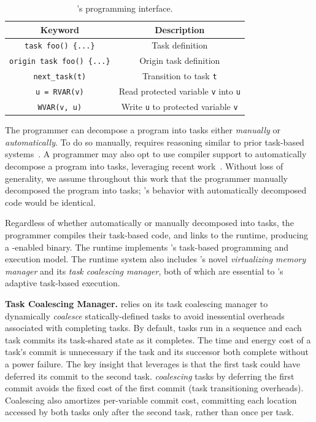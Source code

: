 \begin{table}
	\centering
	\footnotesize
	\begin{tabular}{|c|c|}
		\hline
		\textbf{Keyword} & \textbf{Description} \\
		\hline\hline
		\texttt{task foo() \{...\}} & Task definition\\
		\texttt{origin task foo() \{...\}} & Origin task definition\\
		\texttt{next\_task(t)} & Transition to task \texttt{t}\\
		\texttt{u = RVAR(v)} & Read protected variable \texttt{v} into \texttt{u}\\
		\texttt{WVAR(v, u)} & Write \texttt{u} to protected variable \texttt{v}\\
		\hline
	\end{tabular}
	\caption{\sys's programming interface.}
	\label{tab:viper_syntax}
\end{table}

The programmer can decompose a program into tasks either {\em manually} or {\em
automatically}. To do so manually,  requires reasoning similar to prior
task-based systems~\cite{chain,alpaca}.  
%
A programmer may also opt to use compiler support to automatically decompose a
program into tasks, leveraging recent work~\cite{cleancut,baghsorkhi_cgo_2018}.
%
Without loss of generality, we assume throughout this work that the programmer
manually decomposed the program into tasks; \sys's behavior with automatically
decomposed code would be identical.
%

Regardless of whether automatically or manually decomposed into tasks, the
programmer compiles their task-based code, and links to the \sys runtime,
producing a \sys-enabled binary.
%
The \sys runtime implements \sys's task-based programming and execution model.
%
The runtime system also includes \sys's novel {\em virtualizing memory manager}
and its {\em task coalescing manager}, both of which are essential to \sys's
adaptive task-based execution.

\textbf{\sys Task Coalescing Manager.} \sys relies on its task coalescing
manager to dynamically {\em coalesce} statically\hyp{}defined tasks to avoid
inessential overheads associated with completing tasks.  
%
By default, tasks run in a sequence and each task commits its task-shared state
as it completes.  The time and energy cost of a task's commit is unnecessary if
the task and its successor both complete without a power failure.  The key
insight that \sys leverages is that the first task could have deferred its
commit to the second task. {\em coalescing} tasks by deferring the first commit
avoids the fixed cost of the first commit (task transitioning overheads).
Coalescing also amortizes per-variable commit cost, committing each  location
accessed by both tasks only after the second task, rather than once per task.
%


